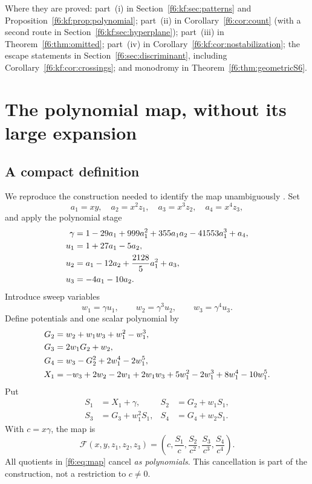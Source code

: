 \documentclass[11pt,a4paper]{article}
\theoremstyle{definition}
\newcommand{\F}{\mathcal F}
\begin{document}
Where they are proved: part~(i) in Section~\ref{f6:kf:sec:patterns} and
Proposition~\ref{f6:kf:prop:polynomial}; part~(ii) in
Corollary~\ref{f6:cor:count} (with a second route in
Section~\ref{f6:kf:sec:hyperplane}); part~(iii) in
Theorem~\ref{f6:thm:omitted}; part~(iv) in
Corollary~\ref{f6:kf:cor:nostabilization}; the escape statements in
Section~\ref{f6:sec:discriminant}, including Corollary~\ref{f6:kf:cor:crossings};
and monodromy in Theorem~\ref{f6:thm:geometricS6}.

\section{The polynomial map, without its large expansion}
\label{f6:sec:map}

\subsection{A compact definition}
We reproduce the construction needed to identify the map unambiguously
\cite[\S4.5.1]{Gao}. Set
\[
 a_1=xy,\quad a_2=x^2z_1,\quad a_3=x^3z_2,\quad a_4=x^4z_3,
\]
and apply the polynomial stage
\begin{align}
 \gamma&=1-29a_1+999a_1^2+355a_1a_2-41553a_1^3+a_4,\notag\\
 u_1&=1+27a_1-5a_2,\label{f6:eq:stage}\\
 u_2&=a_1-12a_2+\frac{2128}{5}a_1^2+a_3,\notag\\
 u_3&=-4a_1-10a_2.\notag
\end{align}
Introduce sweep variables
\[
 w_1=\gamma u_1,\qquad w_2=\gamma^3u_2,\qquad w_3=\gamma^4u_3.
\]
Define potentials and one scalar polynomial by
\begin{align}
 G_2&=w_2+w_1w_3+w_1^2-w_1^3,\notag\\
 G_3&=2w_1G_2+w_2,\notag\\
 G_4&=w_3-G_2^2+2w_1^4-2w_1^5,\label{f6:eq:potentials}\\
 X_1&=-w_3+2w_2-2w_1+2w_1w_3+5w_1^2-2w_1^3
                +8w_1^4-10w_1^5.\notag
\end{align}
Put
\begin{align*}
 S_1&=X_1+\gamma,& S_2&=G_2+w_1S_1,\\
 S_3&=G_3+w_1^2S_1,& S_4&=G_4+w_2S_1.
\end{align*}
With $c=x\gamma$, the map is
\begin{equation}\label{f6:eq:map}
 \F(x,y,z_1,z_2,z_3)=
 \left(c,\frac{S_1}{c},\frac{S_2}{c^2},\frac{S_3}{c^3},\frac{S_4}{c^4}\right).
\end{equation}
All quotients in \eqref{f6:eq:map} cancel \emph{as polynomials}. This
cancellation is part of the construction, not a restriction to $c\ne0$.
\end{document}
